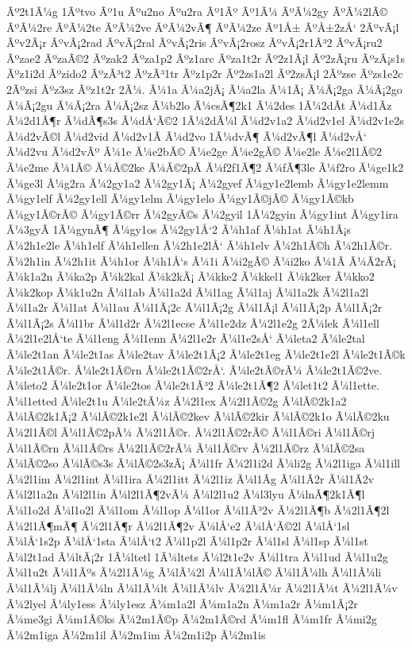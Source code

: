 {Ãº2t1Ã¼g
1Ãºtvo
Ãº1u
Ãºu2no
Ãºu2ra
Ãº1Ãº
Ãº1Ã¼
ÃºÃ¼2gy
ÃºÃ¼2lÃ©
ÃºÃ¼2re
ÃºÃ¼2te
ÃºÃ¼2ve
ÃºÃ¼2vÃ¶
ÃºÃ¼2ze
Ãº1Å±
ÃºÅ±2zÅ‘
2ÃºvÃ¡l
Ãºv2Ã¡r
ÃºvÃ¡2rad
ÃºvÃ¡2ral
ÃºvÃ¡2ris
ÃºvÃ¡2rosz
ÃºvÃ¡2r1Ã³2
ÃºvÃ¡ru2
Ãºzae2
ÃºzaÃ©2
Ãºzak2
Ãºza1p2
Ãºz1arc
Ãºza1t2r
Ãº2z1Ã¡l
Ãº2zÃ¡ru
ÃºzÃ¡s1s
Ãºz1i2d
Ãºzido2
ÃºzÃ³t2
ÃºzÃ³1tr
Ãºz1p2r
Ãº2zs1a2l
Ãº2zsÃ¡l
2Ãºzse
Ãºzs1e2c
2Ãºzsi
Ãºz3sz
Ãºz1t2r
2Ã¼.
Ã¼1a
Ã¼a2jÃ¡
Ã¼a2la
Ã¼1Ã¡
Ã¼Ã¡2ga
Ã¼Ã¡2go
Ã¼Ã¡2gu
Ã¼Ã¡2ra
Ã¼Ã¡2sz
Ã¼b2lo
Ã¼csÃ¶2k1
Ã¼2des
1Ã¼2dÃ­t
Ã¼d1Ã­z
Ã¼2d1Ã¶r
Ã¼dÃ¶s3s
Ã¼dÅ‘Ã©2
1Ã¼2dÃ¼l
Ã¼d2v1a2
Ã¼d2v1el
Ã¼d2v1e2s
Ã¼d2vÃ©l
Ã¼d2vid
Ã¼d2v1Ã­
Ã¼d2vo
1Ã¼dvÃ¶
Ã¼d2vÃ¶l
Ã¼d2vÅ‘
Ã¼d2vu
Ã¼d2vÃº
Ã¼1e
Ã¼e2bÃ©
Ã¼e2ge
Ã¼e2gÃ©
Ã¼e2le
Ã¼e2l1Ã©2
Ã¼e2me
Ã¼1Ã©
Ã¼Ã©2ke
Ã¼Ã©2pÃ­
Ã¼f2f1Ã¶2
Ã¼fÃ¶3le
Ã¼f2ro
Ã¼ge1k2
Ã¼ge3l
Ã¼g2ra
Ã¼2gy1a2
Ã¼2gy1Ã¡
Ã¼2gyef
Ã¼gy1e2lemb
Ã¼gy1e2lemm
Ã¼gy1elf
Ã¼2gy1ell
Ã¼gy1elm
Ã¼gy1elo
Ã¼gy1Ã©jÃ©
Ã¼gy1Ã©kb
Ã¼gy1Ã©rÃ©
Ã¼gy1Ã©rr
Ã¼2gyÃ©s
Ã¼2gyil
1Ã¼2gyin
Ã¼gy1int
Ã¼gy1ira
Ã¼3gyÃ­
1Ã¼gynÃ¶
Ã¼gy1os
Ã¼2gy1Å‘2
Ã¼h1af
Ã¼h1at
Ã¼h1Ã¡s
Ã¼2h1e2le
Ã¼h1elf
Ã¼h1ellen
Ã¼2h1e2lÅ‘
Ã¼h1elv
Ã¼2h1Ã©h
Ã¼2h1Ã©r.
Ã¼2h1in
Ã¼2h1it
Ã¼h1or
Ã¼h1Å‘s
Ã¼1i
Ã¼i2gÃ©
Ã¼i2ko
Ã¼1Ã­
Ã¼Ã­2rÃ¡
Ã¼k1a2n
Ã¼ka2p
Ã¼k2kal
Ã¼k2kÃ¡
Ã¼kke2
Ã¼kkel1
Ã¼k2ker
Ã¼kko2
Ã¼k2kop
Ã¼k1u2n
Ã¼l1ab
Ã¼l1a2d
Ã¼l1ag
Ã¼l1aj
Ã¼l1a2k
Ã¼2l1a2l
Ã¼l1a2r
Ã¼l1at
Ã¼l1au
Ã¼l1Ã¡2c
Ã¼l1Ã¡2g
Ã¼l1Ã¡l
Ã¼l1Ã¡2p
Ã¼l1Ã¡2r
Ã¼l1Ã¡2s
Ã¼l1br
Ã¼l1d2r
Ã¼2l1ecse
Ã¼l1e2dz
Ã¼2l1e2g
2Ã¼lek
Ã¼l1ell
Ã¼2l1e2lÅ‘te
Ã¼l1eng
Ã¼l1enn
Ã¼2l1e2r
Ã¼l1e2sÅ‘
Ã¼leta2
Ã¼le2tal
Ã¼le2t1an
Ã¼le2t1as
Ã¼le2tav
Ã¼le2t1Ã¡2
Ã¼le2t1eg
Ã¼le2t1e2l
Ã¼le2t1Ã©k
Ã¼le2t1Ã©r.
Ã¼le2t1Ã©rn
Ã¼le2t1Ã©2rÅ‘.
Ã¼le2tÃ©rÃ¼
Ã¼le2t1Ã©2ve.
Ã¼leto2
Ã¼le2t1or
Ã¼le2tos
Ã¼le2t1Ã³2
Ã¼le2t1Ã¶2
Ã¼let1t2
Ã¼l1ette.
Ã¼l1etted
Ã¼le2t1u
Ã¼le2tÃ¼z
Ã¼2l1ex
Ã¼2l1Ã©2g
Ã¼lÃ©2k1a2
Ã¼lÃ©2k1Ã¡2
Ã¼lÃ©2k1e2l
Ã¼lÃ©2kev
Ã¼lÃ©2kir
Ã¼lÃ©2k1o
Ã¼lÃ©2ku
Ã¼2l1Ã©l
Ã¼l1Ã©2pÃ¼
Ã¼2l1Ã©r.
Ã¼2l1Ã©2rÃ©
Ã¼l1Ã©ri
Ã¼l1Ã©rj
Ã¼l1Ã©rn
Ã¼l1Ã©rs
Ã¼2l1Ã©2rÃ¼
Ã¼l1Ã©rv
Ã¼2l1Ã©rz
Ã¼lÃ©2sa
Ã¼lÃ©2so
Ã¼lÃ©s3s
Ã¼lÃ©2s3zÃ¡
Ã¼l1fr
Ã¼2l1i2d
Ã¼li2g
Ã¼2l1iga
Ã¼l1ill
Ã¼2l1im
Ã¼2l1int
Ã¼l1ira
Ã¼2l1itt
Ã¼2l1iz
Ã¼l1Ã­g
Ã¼l1Ã­2r
Ã¼l1Ã­2v
Ã¼l2l1a2n
Ã¼l2l1in
Ã¼l2l1Ã¶2vÃ¼
Ã¼l2l1u2
Ã¼l3lyu
Ã¼lnÃ¶2k1Ã¶l
Ã¼l1o2d
Ã¼l1o2l
Ã¼l1om
Ã¼l1op
Ã¼l1or
Ã¼l1Ã³2v
Ã¼2l1Ã¶b
Ã¼2l1Ã¶2l
Ã¼2l1Ã¶mÃ¶
Ã¼2l1Ã¶r
Ã¼2l1Ã¶2v
Ã¼lÅ‘e2
Ã¼lÅ‘Ã©2l
Ã¼lÅ‘1sl
Ã¼lÅ‘1s2p
Ã¼lÅ‘1sta
Ã¼lÅ‘t2
Ã¼l1p2l
Ã¼l1p2r
Ã¼l1sl
Ã¼l1sp
Ã¼l1st
Ã¼l2t1ad
Ã¼ltÃ¡2r
1Ã¼ltetl
1Ã¼ltets
Ã¼l2t1e2v
Ã¼l1tra
Ã¼l1ud
Ã¼l1u2g
Ã¼l1u2t
Ã¼l1Ãºs
Ã¼2l1Ã¼g
Ã¼lÃ¼2l
Ã¼l1Ã¼lÃ©
Ã¼l1Ã¼lh
Ã¼l1Ã¼li
Ã¼l1Ã¼lj
Ã¼l1Ã¼ln
Ã¼l1Ã¼lt
Ã¼l1Ã¼lv
Ã¼2l1Ã¼r
Ã¼2l1Ã¼t
Ã¼2l1Ã¼v
Ã¼2lyel
Ã¼ly1ess
Ã¼ly1esz
Ã¼m1a2l
Ã¼m1a2n
Ã¼m1a2r
Ã¼m1Ã¡2r
Ã¼me3gi
Ã¼m1Ã©ks
Ã¼2m1Ã©p
Ã¼2m1Ã©rd
Ã¼m1fl
Ã¼m1fr
Ã¼mi2g
Ã¼2m1iga
Ã¼2m1il
Ã¼2m1im
Ã¼2m1i2p
Ã¼2m1is
}
